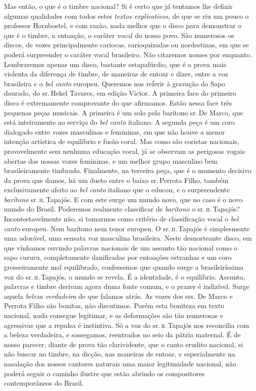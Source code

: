 Mas então, o que é o timbre nacional? Si é certo que já tentamos lhe
definir algumas qualidades com todos estes \textit{textos explicativos}, de
que se riu um pouco o professor Hornbostel, e com razão, nada melhor que
o disco para demonstrar o que é o timbre, a entoação, o caráter vocal do
nosso povo. São numerosos os discos, de vozes principalmente cariocas,
carioquizadas ou nordestinas, em que se poderá surpreender o caráter
vocal brasileiro. Não citaremos nomes por enquanto. Lembraremos apenas
um disco, bastante estapafúrdio, que é a prova mais violenta da
diferença de timbre, de maneiras de entoar e dizer, entre a voz
brasileira e o \textit{bel canto} europeu. Queremos nos referir à gravação do
Sapo dourado, do sr.\,Hekel Tavares, em edição Victor. A primeira face do
primeiro disco é extremamente comprovante do que afirmamos. Estão nessa
face três pequenas peças musicais. A primeira é um solo pelo barítono
sr.\,De Marco, que está inteiramente ao serviço do \textit{bel canto} italiano. A
segunda peça é um coro dialogado entre vozes masculinas e femininas, em
que não houve a menor intenção artística de equilíbrio e fusão coral.
Mas como são coristas nacionais, provavelmente sem nenhuma educação
vocal, já se observam as perigosas vogais abertas das nossas vozes
femininas, e um melhor grupo masculino bem brasileiramente timbrado.
Finalmente, na terceira peça, que é o momento decisivo da prova que
damos, há um dueto entre o baixo sr.\,Perrota Filho, também
exclusivamente afeito ao \textit{bel canto} italiano que o educou, e o
surpreendente \textit{barítono} sr.\,\textsc{h}.\,Tapajós. E com este surge um mundo
novo, que no caso é o novo mundo do Brasil. Poderemos realmente
classificar de \textit{barítono} o sr.\,\textsc{h}.\,Tapajós? Incontestavelmente não, si
tomarmos como critério de classificação vocal o \textit{bel canto} europeu. Nem
barítono nem tenor europeu. O sr.\,\textsc{h}.\,Tapajós é simplesmente uma
adorável, uma sensata voz masculina brasileira. Neste desnorteante
disco, em que vínhamos ouvindo palavras nacionais de um assunto tão
nacional como o sapo cururu, completamente danificadas por entoações
estranhas e um coro grosseiramente mal equilibrado, confessemos que
quando surge a brasileiríssima voz do sr.\,\textsc{h}.\,Tapajós, o mundo se revela.
É a identidade, é o equilíbrio. Assunto, palavras e timbre derivam agora
duma fonte comum, e o prazer é indizível. Surge aquela \textit{beleza
verdadeira} de que falamos atrás. As vozes dos srs. De Marco e Perrota
Filho são bonitas, não discutimos. Porém esta boniteza em texto
nacional, nada consegue legitimar, e as deformações são tão numerosas e
agressivas que a repulsa é instintiva. Só a voz do sr.\,\textsc{h}.\,Tapajós nos
reconcilia com a beleza verdadeira, e sossegamos, reentrados no seio da
pátria maternal. É de nosso parecer, diante de prova tão clarividente,
que o canto erudito nacional, si não buscar no timbre, na dicção, nas
maneiras de entoar, e especialmente na nasalação dos nossos cantores
naturais uma maior legitimidade nacional, não poderá seguir o caminho
ilustre que estão abrindo os compositores contemporâneos do Brasil.

